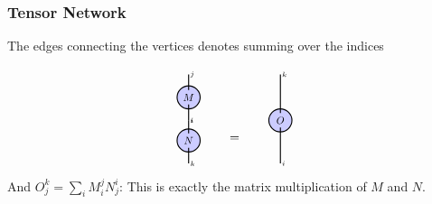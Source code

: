 \documentclass[aspectratio=169]{beamer}
\begin{document}
\begin{frame}
	\frametitle{Tensor Network}

	The edges connecting the vertices denotes summing over the indices

	$$
	\begin{tikzpicture}[baseline=-0.1ex, scale=0.8, every node/.style={transform shape}]
	\draw[fill=blue!20, thick] (0,1.5) circle (0.4) node (A) {$M$};
      \draw[thick] (A.south) -- (0,0.7) node[right=-2pt] {\scriptsize $i$};
      \draw[thick] (A.north) -- (0,2.3) node[right=-2pt] {\scriptsize $j$};
	\draw[fill=blue!20, thick] (0,0) circle (0.4) node (A) {$N$};
      \draw[thick] (A.north) -- (0,0.7) node[right=-2pt] {\scriptsize $i$};
      \draw[thick] (A.south) -- (0,-0.8) node[right=-2pt] {\scriptsize $k$};
    \end{tikzpicture} \qquad = \qquad
	\begin{tikzpicture}[baseline=-0.1ex, scale=0.8, every node/.style={transform shape}]
	\draw[fill=blue!20, thick] (0,0.7) circle (0.4) node (A) {$O$};
      \draw[thick] (A.south) -- (0,-0.8) node[right=-2pt] {\scriptsize $i$};
      \draw[thick] (A.north) -- (0,2.3) node[right=-2pt] {\scriptsize $k$};
    \end{tikzpicture}
	$$
	And $O^k_j = \sum_i M^j_i N^i_j$: This is exactly the matrix multiplication of $M$ and $N$.
\end{frame}
\end{document}
